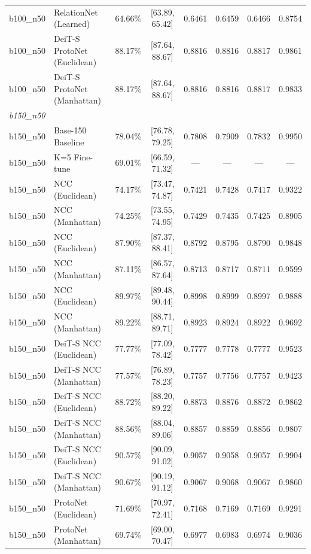 \begin{table}[htbp]
\begin{tabular}{lllccccc}
b100\_n50 & RelationNet (Learned) & 64.66\% & [63.89, 65.42] & 0.6461 & 0.6459 & 0.6466 & 0.8754 \\
b100\_n50 & DeiT-S ProtoNet (Euclidean) & 88.17\% & [87.64, 88.67] & 0.8816 & 0.8816 & 0.8817 & 0.9861 \\
b100\_n50 & DeiT-S ProtoNet (Manhattan) & 88.17\% & [87.64, 88.67] & 0.8816 & 0.8816 & 0.8817 & 0.9833 \\
\hline
\multicolumn{8}{l}{\textit{b150\_n50}} \\
b150\_n50 & Base-150 Baseline & 78.04\% & [76.78, 79.25] & 0.7808 & 0.7909 & 0.7832 & 0.9950 \\
b150\_n50 & K=5 Fine-tune & 69.01\% & [66.59, 71.32] & --- & --- & --- & --- \\
b150\_n50 & NCC (Euclidean) & 74.17\% & [73.47, 74.87] & 0.7421 & 0.7428 & 0.7417 & 0.9322 \\
b150\_n50 & NCC (Manhattan) & 74.25\% & [73.55, 74.95] & 0.7429 & 0.7435 & 0.7425 & 0.8905 \\
b150\_n50 & NCC (Euclidean) & 87.90\% & [87.37, 88.41] & 0.8792 & 0.8795 & 0.8790 & 0.9848 \\
b150\_n50 & NCC (Manhattan) & 87.11\% & [86.57, 87.64] & 0.8713 & 0.8717 & 0.8711 & 0.9599 \\
b150\_n50 & NCC (Euclidean) & 89.97\% & [89.48, 90.44] & 0.8998 & 0.8999 & 0.8997 & 0.9888 \\
b150\_n50 & NCC (Manhattan) & 89.22\% & [88.71, 89.71] & 0.8923 & 0.8924 & 0.8922 & 0.9692 \\
b150\_n50 & DeiT-S NCC (Euclidean) & 77.77\% & [77.09, 78.42] & 0.7777 & 0.7778 & 0.7777 & 0.9523 \\
b150\_n50 & DeiT-S NCC (Manhattan) & 77.57\% & [76.89, 78.23] & 0.7757 & 0.7756 & 0.7757 & 0.9423 \\
b150\_n50 & DeiT-S NCC (Euclidean) & 88.72\% & [88.20, 89.22] & 0.8873 & 0.8876 & 0.8872 & 0.9862 \\
b150\_n50 & DeiT-S NCC (Manhattan) & 88.56\% & [88.04, 89.06] & 0.8857 & 0.8859 & 0.8856 & 0.9807 \\
b150\_n50 & DeiT-S NCC (Euclidean) & 90.57\% & [90.09, 91.02] & 0.9057 & 0.9058 & 0.9057 & 0.9904 \\
b150\_n50 & DeiT-S NCC (Manhattan) & 90.67\% & [90.19, 91.12] & 0.9067 & 0.9068 & 0.9067 & 0.9860 \\
b150\_n50 & ProtoNet (Euclidean) & 71.69\% & [70.97, 72.41] & 0.7168 & 0.7169 & 0.7169 & 0.9291 \\
b150\_n50 & ProtoNet (Manhattan) & 69.74\% & [69.00, 70.47] & 0.6977 & 0.6983 & 0.6974 & 0.9036 \\

\end{tabular}
\end{table}
